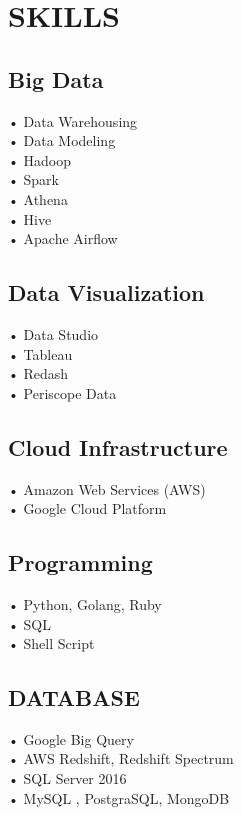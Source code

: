 \documentclass[letterpaper]{deedy-resume} %
\begin{document}
\begin{minipage}[t]{0.33\textwidth} %


\section{SKILLS}
\subsection{Big Data}
• Data Warehousing \\
• Data Modeling \\
• Hadoop \\
• Spark \\
• Athena \\
• Hive \\
• Apache Airflow  \\

\subsection{Data Visualization}
• Data Studio \\
• Tableau \\
• Redash \\
• Periscope Data \\

\subsection{Cloud Infrastructure}
• Amazon Web Services (AWS) \\
• Google Cloud Platform

\sectionspace %

\subsection{Programming}
• Python, Golang, Ruby \\
• SQL \\
• Shell Script\\

\subsection{DATABASE}
• Google Big Query \\
• AWS Redshift, Redshift Spectrum  \\
• SQL Server 2016 \\
• MySQL , PostgraSQL, MongoDB
\sectionspace %


\end{minipage}
\end{document}

